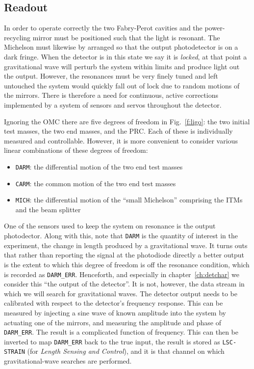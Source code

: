 \subsection{Readout}
\label{ssec:readout}

In order to operate correctly the two Fabry-Perot cavities and the
power-recycling mirror must be positioned such that the light is
resonant.  The Michelson must likewise by arranged so that the output
photodetector is on a dark fringe.  When the detector is in this
state we say it is \emph{locked}, at that point a gravitational wave
will perturb the system within limits and produce light out the
output.  However, the resonances must be very finely tuned and left
untouched the system would quickly fall out of lock due to random
motions of the mirrors.  There is therefore a need for continuous,
active corrections implemented by a system of sensors and servos
throughout the detector.

Ignoring the OMC there are five degrees of freedom in
Fig.~\ref{f:ligo}: the two initial test masses, the two end masses,
and the PRC.  Each of these is individually measured and controllable.
However, it is more convenient to consider various linear combinations
of these degrees of freedom:

\begin{itemize}
\item \texttt{DARM}: the differential motion of the two end test masses
\item \texttt{CARM}: the common motion of the two end test masses
\item \texttt{MICH}: the differential motion of the ``small Michelson'' comprising
the ITMs and the beam splitter
\end{itemize}

One of the sensors used to keep the system on resonance is the output
photodector.  Along with this, note that \texttt{DARM} is the quantity
of interest in the experiment, the change in length produced by a
gravitational wave.    It turns outs that rather than reporting the
signal at the photodiode directly a better output is the extent to
which this degree of freedom is off the resonance condition, which is
recorded as \texttt{DARM\_ERR}.  Henceforth, and especially in
chapter~\ref{ch:detchar} we consider this ``the output of the
detector''.  It is not, however, the data stream in which we will
search for gravitational waves.  The detector output needs to be
calibrated with respect to the detector's frequency response.  This
can be measured by injecting a sine wave of known amplitude into the
system by actuating one of the mirrors, and measuring the amplitude
and phase of \texttt{DARM\_ERR}.  The result is a complicated function of
frequency.  This can then be inverted to map \texttt{DARM\_ERR} back to the true
input, the result is stored as \texttt{LSC-STRAIN} (for \emph{Length
Sensing and Control}), and it is that channel on which
gravitational-wave searches are performed.

